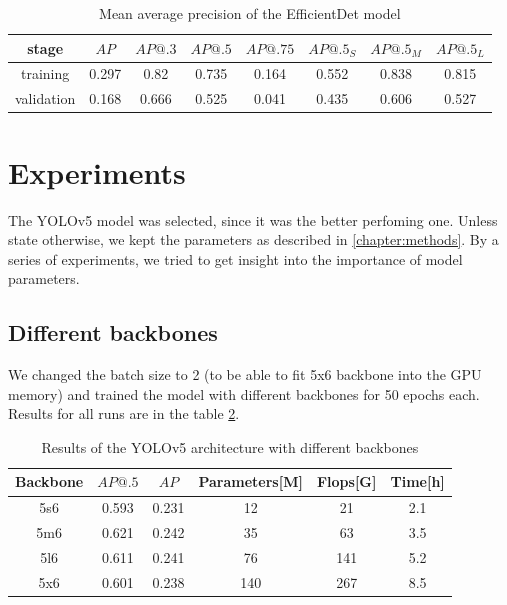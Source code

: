 \begin{table}
    \begin{tabular}{c|c|c|c|c|c|c|c}
        stage      & $AP$  & $AP@.3$ & $AP@.5$ & $AP@.75$ & $AP@.5_S$ & $AP@.5_M$ & $AP@.5_L$ \\ \hline
        training   & 0.297 & 0.82    & 0.735   & 0.164    & 0.552     & 0.838     & 0.815     \\ \hline
        validation & 0.168 & 0.666   & 0.525   & 0.041    & 0.435     & 0.606     & 0.527     \\
    \end{tabular}
    \caption{Mean average precision of the EfficientDet model}
    \label{tab:effdet_basic}
\end{table}


\section{Experiments}
The YOLOv5 model was selected, since it was the better perfoming one. Unless state otherwise, we kept the parameters as described in \ref{chapter:methods}. By a series of experiments, we tried to get insight into the importance of model parameters.
\subsection{Different backbones}
We changed the batch size to 2 (to be able to fit 5x6 backbone into the GPU memory) and trained the model with different backbones for 50 epochs each. Results for all runs are in the table \ref{tab:yolov5_backbones}.

\begin{table}
    \begin{tabular}{c|c|c|c|c|c}
        Backbone & $AP@.5$ & $AP$  & Parameters[M] & Flops[G] & Time[h] \\ \hline
        5s6      & 0.593   & 0.231 & 12            & 21       & 2.1     \\ \hline
        5m6      & 0.621   & 0.242 & 35            & 63       & 3.5     \\ \hline
        5l6      & 0.611   & 0.241 & 76            & 141      & 5.2     \\ \hline
        5x6      & 0.601   & 0.238 & 140           & 267      & 8.5     \\
    \end{tabular}
    \caption{Results of the YOLOv5 architecture with different backbones}
    \label{tab:yolov5_backbones}
\end{table}

